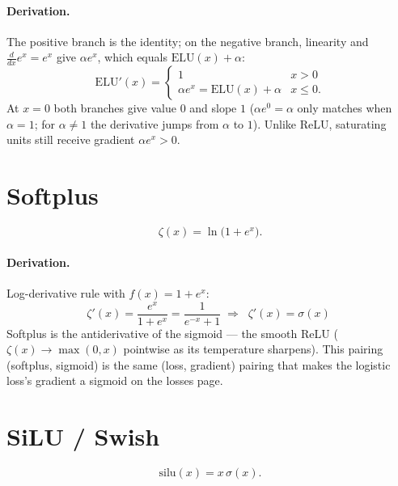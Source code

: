 \documentclass[11pt]{article}
\begin{document}
\paragraph{Derivation.} The positive branch is the identity; on the
negative branch, linearity and $\frac{d}{dx}e^x = e^x$ give
$\alpha e^{x}$, which equals $\mathrm{ELU}(x) + \alpha$:
\begin{equation}
  \mathrm{ELU}'(x) =
  \begin{cases}
    1 & x > 0\\
    \alpha e^{x} = \mathrm{ELU}(x) + \alpha & x \le 0.
  \end{cases}
  \label{eq:eluprime}
\end{equation}
At $x=0$ both branches give value $0$ and slope $1$
($\alpha e^0 = \alpha$ only matches when $\alpha = 1$; for
$\alpha \ne 1$ the derivative jumps from $\alpha$ to $1$). Unlike
ReLU, saturating units still receive gradient $\alpha e^x > 0$.

\section{Softplus}

\begin{equation}
  \zeta(x) = \ln\bigl(1 + e^{x}\bigr).
  \label{eq:softplus}
\end{equation}

\paragraph{Derivation.} Log-derivative rule with $f(x) = 1 + e^{x}$:
\begin{equation}
  \zeta'(x) = \frac{e^{x}}{1 + e^{x}}
  = \frac{1}{e^{-x} + 1}
  \;\Longrightarrow\;
  \boxed{\;\zeta'(x) = \sigma(x)\;}
  \label{eq:softplusprime}
\end{equation}
Softplus is the antiderivative of the sigmoid --- the smooth ReLU
($\zeta(x) \to \max(0,x)$ pointwise as its temperature sharpens). This
pairing (softplus, sigmoid) is the same (loss, gradient) pairing that
makes the logistic loss's gradient a sigmoid on the losses page.

\section{SiLU / Swish}

\begin{equation}
  \mathrm{silu}(x) = x\,\sigma(x).
  \label{eq:silu}
\end{equation}
\end{document}
